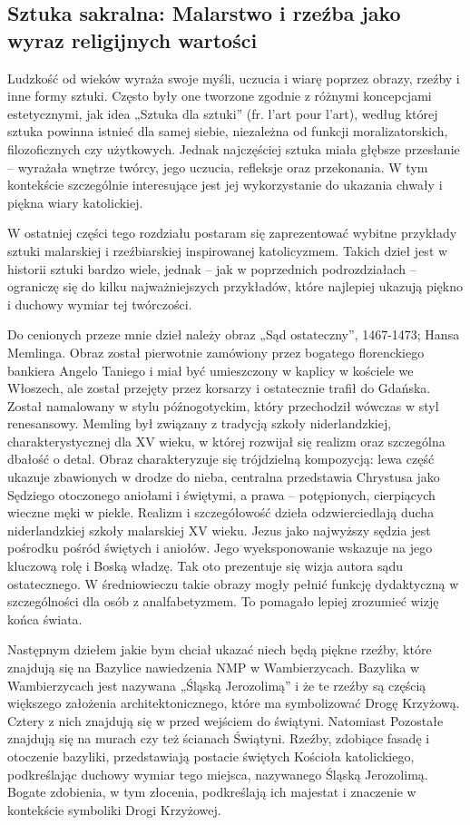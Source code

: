 \subsection{Sztuka sakralna: Malarstwo i rzeźba jako wyraz religijnych wartości}

Ludzkość od wieków wyraża swoje myśli, uczucia i wiarę poprzez obrazy, rzeźby i
inne formy sztuki. Często były one tworzone zgodnie z różnymi koncepcjami estetycznymi,
jak idea „Sztuka dla sztuki” (fr. l’art pour l’art), według której sztuka powinna istnieć dla
samej siebie, niezależna od funkcji moralizatorskich, filozoficznych czy użytkowych.
Jednak najczęściej sztuka miała głębsze przesłanie – wyrażała wnętrze twórcy, jego
uczucia, refleksje oraz przekonania. W tym kontekście szczególnie interesujące jest jej
wykorzystanie do ukazania chwały i piękna wiary katolickiej.

W ostatniej części tego rozdziału postaram się zaprezentować wybitne przykłady
sztuki malarskiej i rzeźbiarskiej inspirowanej katolicyzmem. Takich dzieł jest w historii
sztuki bardzo wiele, jednak – jak w poprzednich podrozdziałach – ograniczę się do kilku
najważniejszych przykładów, które najlepiej ukazują piękno i duchowy wymiar tej
twórczości.

Do cenionych przeze mnie dzieł należy obraz „Sąd ostateczny”, 1467-1473; Hansa
Memlinga. Obraz został pierwotnie zamówiony przez bogatego florenckiego bankiera
Angelo Taniego i miał być umieszczony w kaplicy w kościele we Włoszech, ale został
przejęty przez korsarzy i ostatecznie trafił do Gdańska. Został namalowany w stylu
późnogotyckim, który przechodził wówczas w styl renesansowy. Memling był związany z
tradycją szkoły niderlandzkiej, charakterystycznej dla XV wieku, w której rozwijał się
realizm oraz szczególna dbałość o detal. Obraz charakteryzuje się trójdzielną kompozycją:
lewa część ukazuje zbawionych w drodze do nieba, centralna przedstawia Chrystusa jako
Sędziego otoczonego aniołami i świętymi, a prawa – potępionych, cierpiących wieczne
męki w piekle. Realizm i szczegółowość dzieła odzwierciedlają ducha niderlandzkiej szkoły
malarskiej XV wieku. Jezus jako najwyższy sędzia jest pośrodku pośród świętych i aniołów.
Jego wyeksponowanie wskazuje na jego kluczową rolę i Boską władzę. Tak oto prezentuje
się wizja autora sądu ostatecznego. W średniowieczu takie obrazy mogły pełnić funkcję
dydaktyczną w szczególności dla osób z analfabetyzmem. To pomagało lepiej zrozumieć
wizję końca świata. 

Następnym dziełem jakie bym chciał ukazać niech będą piękne rzeźby, które znajdują się
na Bazylice nawiedzenia NMP w Wambierzycach. Bazylika w Wambierzycach jest
nazywana „Śląską Jerozolimą” i że te rzeźby są częścią większego założenia
architektonicznego, które ma symbolizować Drogę Krzyżową. Cztery z nich znajdują się w
przed wejściem do świątyni. Natomiast Pozostałe znajdują się na murach czy też
ścianach Świątyni. Rzeźby, zdobiące fasadę i otoczenie bazyliki, przedstawiają postacie
świętych Kościoła katolickiego, podkreślając duchowy wymiar tego miejsca, nazywanego
Śląską Jerozolimą. Bogate zdobienia, w tym złocenia, podkreślają ich majestat i znaczenie
w kontekście symboliki Drogi Krzyżowej.

